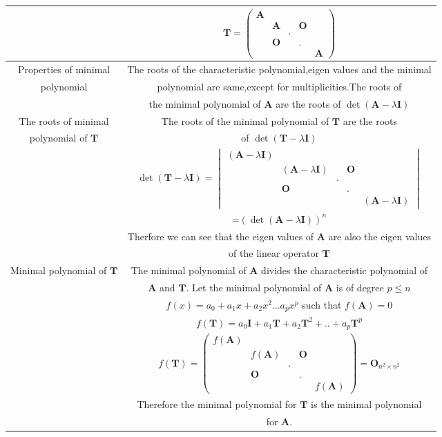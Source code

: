 \documentclass[journal,12pt,twocolumn]{IEEEtran}
\providecommand{\brak}[1]{\ensuremath{\left(#1\right)}}
\newcommand{\myvec}[1]{\ensuremath{\begin{pmatrix}#1\end{pmatrix}}}
\newcommand{\mydet}[1]{\ensuremath{\begin{vmatrix}#1\end{vmatrix}}}
\numberwithin{equation}{subsection}
\let\vec\mathbf
\begin{document}
\begin{table}[h]
    \centering
    \begin{tabular}{|c|c|}
    \hline
         & $\vec{T}=\myvec{\vec{A}&&&&\\&\vec{A}&&\vec{O}&\\&&.&&\\&\vec{O}&&.&\\&&&&\vec{A}}$\\
    \hline
        Properties of minimal & The roots of the characteristic polynomial,eigen values and the minimal  \\
        polynomial &polynomial are same,except for multiplicities.The roots of\\
        & the minimal polynomial of $\vec{A}$ are the roots of $\det\brak{\vec{A}-\lambda\vec{I}}$\\
    \hline
        The roots of minimal & The roots of the minimal polynomial of $\vec{T}$ are the roots\\
        polynomial of $\vec{T}$& of $\det \brak{\vec{T}-\lambda\vec{I}}$\\
        &$\det \brak{\vec{T}-\lambda\vec{I}}=\mydet{\brak{\vec{A}-\lambda\vec{I}}&&&&\\&\brak{\vec{A}-\lambda\vec{I}}&&\vec{O}&\\&&.&&\\&\vec{O}&&.&\\&&&&\brak{\vec{A}-\lambda\vec{I}}}$\\
        &=$\brak{\det \brak{\vec{A}-\lambda\vec{I}}}^{n}$\\
        & Therfore we can see that the eigen values of $\vec{A}$ are also the eigen values \\
        &of the linear operator $\vec{T}$\\
    \hline
        Minimal polynomial of $\vec{T}$ & The minimal polynomial of $\vec{A}$ divides the characteristic polynomial of \\
        &$\vec{A}$ and $\vec{T}$. Let the minimal polynomial of $\vec{A}$ is of degree $p\leq n$\\
        & $f\brak{x}=a_0+a_1x+a_2x^2...a_px^p$ such that $f\brak{\vec{A}}=0$\\
        &$f\brak{\vec{T}}=a_0\vec{I}+a_1\vec{T}+a_2\vec{T}^2+..+a_p\vec{T}^p$\\
        &$f\brak{\vec{T}}=\myvec{f\brak{\vec{A}}&&&&\\&f\brak{\vec{A}}&&\vec{O}&\\&&.&&\\&\vec{O}&&.&\\&&&&f\brak{\vec{A}}}=\vec{O}_{n^2\times n^2}$\\
        &Therefore the minimal polynomial for $\vec{T}$ is the minimal polynomial\\
        & for $\vec{A}$.\\
    \hline
    \end{tabular}
\end{table}
\end{document}
